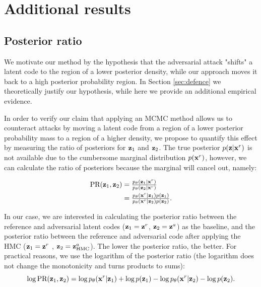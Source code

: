 \newpage

\section{Additional results}
\subsection{Posterior ratio} \label{appendix:posterior_ratio}

We motivate our method by the hypothesis that the adversarial attack "shifts" a latent code to the region of a lower posterior density, while our approach moves it back to a high posterior probability region. In Section \ref{sec:defence} we theoretically justify our hypothesis, while here we provide an additional empirical evidence.

In order to verify our claim that applying an MCMC method allows us to counteract attacks by moving a latent code from a region of a lower posterior probability mass to a region of a higher density, we propose to quantify this effect by measuring the ratio of posteriors for ${\mathbf{z}}_1$ and ${\mathbf{z}}_2$. The true posterior $p({\mathbf{z}} | {\mathbf{x}}^{r})$ is not available due to the cumbersome marginal distribution $p({\mathbf{x}}^{r})$, however, we can calculate the ratio of posteriors because the marginal will cancel out, namely:

\begin{align}
\text{PR}({\mathbf{z}}_1, {\mathbf{z}}_2) &= \tfrac{p_{\theta}({\mathbf{z}}_1|{\mathbf{x}}^r)}{p_{\theta}({\mathbf{z}}_2|{\mathbf{x}}^r)} \\
&= \tfrac{p_{\theta}({\mathbf{x}}^r|{\mathbf{z}}_1)p({\mathbf{z}}_1)}{p_{\theta}({\mathbf{x}}^r| {\mathbf{z}}_2)p({\mathbf{z}}_2)} .
\end{align}

In our case, we are interested in calculating the posterior ratio between the reference and adversarial latent codes (${\mathbf{z}}_1 = {\mathbf{z}}^r$,  ${\mathbf{z}}_2 = {\mathbf{z}}^a$) as the baseline, and the posterior ratio between the reference and adversarial code after applying the HMC (${\mathbf{z}}_1 = {\mathbf{z}}^r$ , ${\mathbf{z}}_2 = {\mathbf{z}}^a_{\text{HMC}}$). The lower the posterior ratio, the better. For practical reasons, we use the logarithm of the posterior ratio (the logarithm does not change the monotonicity and turns products to sums):
\begin{equation}
    \log \text{PR}({\mathbf{z}}_1, {\mathbf{z}}_2) = \log p_{\theta}({\mathbf{x}}^r|{\mathbf{z}}_1) + \log p({\mathbf{z}}_1) - \log p_{\theta}({\mathbf{x}}^r| {\mathbf{z}}_2) - \log p({\mathbf{z}}_2) .
\end{equation}

